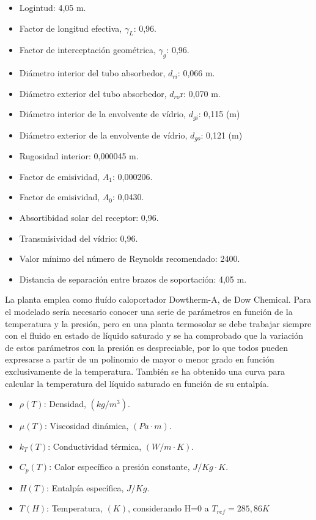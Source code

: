 \begin{itemize}
\tightlist
\item
  Logintud: 4,05 m.
\item
  Factor de longitud efectiva, \(\gamma_L\): 0,96.
\item
  Factor de interceptación geométrica, \(\gamma_g\): 0,96.
\item
  Diámetro interior del tubo absorbedor, \(d_{ri}\): 0,066 m.
\item
  Diámetro exterior del tubo absorbedor, \(d_{ro}\)r: 0,070 m.
\item
  Diámetro interior de la envolvente de vídrio, \(d_{gi}\): 0,115 (m)
\item
  Diámetro exterior de la envolvente de vídrio, \(d_{go}\): 0,121 (m)
\item
  Rugosidad interior: 0,000045 m.
\item
  Factor de emisividad, \(A_1\): 0,000206.
\item
  Factor de emisividad, \(A_0\): 0,0430.
\item
  Absortibidad solar del receptor: 0,96.
\item
  Transmisividad del vídrio: 0,96.
\item
  Valor mínimo del número de Reynolds recomendado: 2400.
\item
  Distancia de separación entre brazos de soportación: 4,05 m.
\end{itemize}

La planta emplea como fluído caloportador Dowtherm-A, de Dow Chemical.
Para el modelado sería necesario conocer una serie de parámetros en
función de la temperatura y la presión, pero en una planta termosolar se
debe trabajar siempre con el fluido en estado de líquido saturado y se
ha comprobado que la variación de estos parámetros con la presión es
despreciable, por lo que todos pueden expresarse a partir de un
polinomio de mayor o menor grado en función exclusivamente de la
temperatura. También se ha obtenido una curva para calcular la
temperatura del líquido saturado en función de su entalpía.

\begin{itemize}
\tightlist
\item
  \(\rho(T)\): Densidad, \((kg/m^3)\).
\item
  \(\mu(T)\): Viscosidad dinámica, \((Pa \cdot m)\).
\item
  \(k_T(T)\): Conductividad térmica, \((W/m \cdot K)\).
\item
  \(C_p(T)\): Calor específico a presión constante, \(J/Kg\cdot K\).
\item
  \(H(T)\): Entalpía específica, \(J/Kg\).
\item
  \(T(H)\): Temperatura, \((K)\), considerando H=0 a
  \(T_{ref}= 285,86 K\)
\end{itemize}

